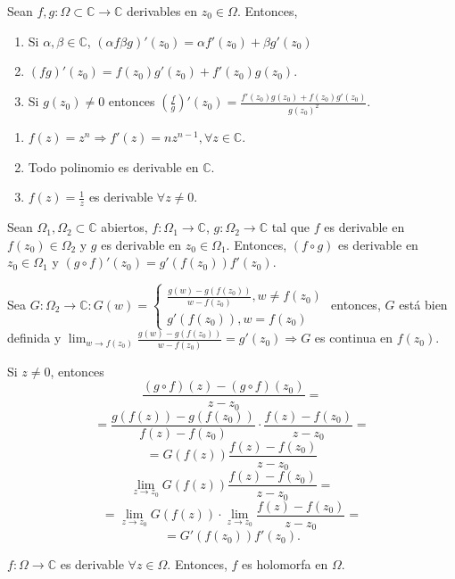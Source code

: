 \begin{prop}
  Sean $f,g: \Omega \subset \mathbb{C} \to \mathbb{C}$ derivables en $z_{0} \in \Omega$. Entonces, 
  \begin{enumerate}[label=(\roman*)]
    \item Si $\alpha, \beta \in \mathbb{C}$, $(\alpha f \beta g)'(z_{0}) = \alpha f'(z_{0}) + \beta g'(z_{0})$
    \item $(fg)'(z_{0}) = f(z_{0})g'(z_{0}) + f'(z_{0})g(z_{0})$.
    \item Si $ g(z_{0}) \neq 0$ entonces $(\frac{f}{g})'(z_{0}) = \frac{f'(z_{0})g(z_{0}) + f(z_{0})g'(z_{0})}{g(z_{0})^{2}}$.
  \end{enumerate}
\end{prop}

\begin{dem}

\end{dem}

\begin{ejm}
  \begin{enumerate}[label=(\roman*)]
    \item $f(z) = z^{n} \Rightarrow f'(z) = n z^{n-1}, \forall z \in \mathbb{C}$.
    \item Todo polinomio es derivable en $\mathbb{C}$.
    \item $f(z) = \frac{1}{z}$ es derivable $\forall z \neq 0$.
  \end{enumerate}
\end{ejm}

\begin{theo}
  Sean $\Omega_{1}, \Omega_{2} \subset \mathbb{C}$ abiertos, $ f: \Omega_{1} \to \mathbb{C}$, $g: \Omega_{2} \to \mathbb{C}$ tal que $f$ es derivable en $f(z_{0}) \in \Omega_{2}$ y $g$ es derivable en $z_{0} \in \Omega_{1}$. Entonces, $(f \circ g)$ es derivable en $z_{0} \in \Omega_{1}$ y $(g \circ f)'(z_{0}) = g'(f(z_{0}))f'(z_{0})$.
\end{theo}

\begin{dem}
  Sea $G: \Omega_{2} \to \mathbb{C} : G(w) =
  \begin{cases}
    \frac{g(w) - g(f(z_{0}))}{w - f(z_{0})}, w \neq f(z_{0}) \\
    g'(f(z_{0})), w=f(z_{0})
  \end{cases}$
  entonces, $G$ está bien definida y $ \lim_{w \to f(z_{0})} \frac{g(w) - g(f(z_{0}))}{w - f(z_{0})} = g'(z_{0}) \Rightarrow G$ es continua en $f(z_{0})$.

  Si $z \neq 0$, entonces
  \[
    \frac{(g \circ f)(z) - (g \circ f)(z_{0})}{z - z_{0}} = 
  \] 
  \[ = \frac{g(f(z)) - g(f(z_{0}))}{f(z) - f(z_{0})} \cdot \frac{f(z)-f(z_{0})}{z - z_{0}} =
  \] 
  \[
    = G(f(z)) \frac{f(z) - f(z_{0})}{z-z_{0}}
  \]
  \[ 
    \lim_{z \to z_{0}} G(f(z)) \frac{f(z) - f(z_{0})}{z-z_{0}} =
  \] 
  \[ 
    = \lim_{z \to z_{0}} G(f(z)) \cdot \lim_{z \to z_{0}} \frac{f(z) - f(z_{0})}{z -z_{0}} = 
  \]
  \[
    =G'(f(z_{0}))f'(z_{0}) .
  \] 
\end{dem}

\begin{obs}
  $f: \Omega \to \mathbb{C}$ es derivable $\forall z \in \Omega$. Entonces, $f$ es holomorfa en $\Omega$.
\end{obs}
